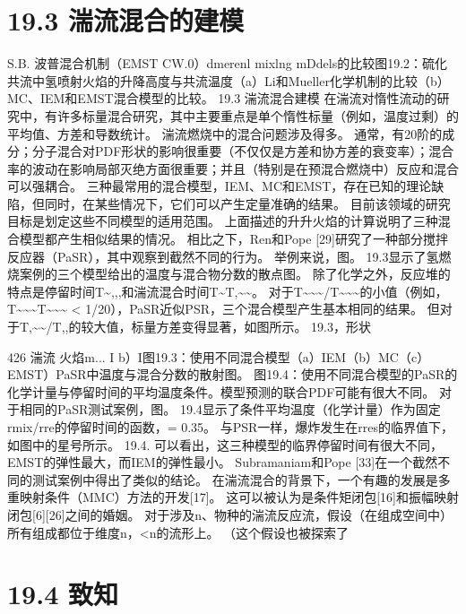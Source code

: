 \documentclass[UTF8,11pt,a4paper,openany,fontset=fandol]{ctexbook}
\begin{document}
\section{19.3 湍流混合的建模}
S.B. 波普混合机制（EMST CW.0）dmerenl mixlng mDdels的比较图19.2：硫化共流中氢喷射火焰的升降高度与共流温度（a）Li和Mueller化学机制的比较（b）MC、IEM和EMST混合模型的比较。 19.3 湍流混合建模 在湍流对惰性流动的研究中，有许多标量混合研究，其中主要重点是单个惰性标量（例如，温度过剩）的平均值、方差和导数统计。 湍流燃烧中的混合问题涉及得多。 通常，有20阶的成分；分子混合对PDF形状的影响很重要（不仅仅是方差和协方差的衰变率）；混合率的波动在影响局部灭绝方面很重要；并且（特别是在预混合燃烧中）反应和混合可以强耦合。 三种最常用的混合模型，IEM、MC和EMST，存在已知的理论缺陷，但同时，在某些情况下，它们可以产生定量准确的结果。 目前该领域的研究目标是划定这些不同模型的适用范围。 上面描述的升升火焰的计算说明了三种混合模型都产生相似结果的情况。 相比之下，Ren和Pope [29]研究了一种部分搅拌反应器（PaSR），其中观察到截然不同的行为。 举例来说，图。 19.3显示了氢燃烧案例的三个模型给出的温度与混合物分数的散点图。 除了化学之外，反应堆的特点是停留时间T\textasciitilde{},,,和湍流混合时间T\textasciitilde{}T,\textasciitilde{}\textasciitilde{}。 对于T\textasciitilde{}\textasciitilde{}\textasciitilde{}/T\textasciitilde{}\textasciitilde{}\textasciitilde{}的小值（例如，T\textasciitilde{}\textasciitilde{}\textasciitilde{}T\textasciitilde{}\textasciitilde{}\textasciitilde{} < 1/20），PaSR近似PSR，三个混合模型产生基本相同的结果。 但对于T,\textasciitilde{}\textasciitilde{}/T,,的较大值，标量方差变得显著，如图所示。 19.3，形状

426 湍流 火焰m... I b）I图19.3：使用不同混合模型（a）IEM（b）MC（c）EMST）PaSR中温度与混合分数的散射图。 图19.4：使用不同混合模型的PaSR的化学计量与停留时间的平均温度条件。模型预测的联合PDF可能有很大不同。 对于相同的PaSR测试案例，图。 19.4显示了条件平均温度（化学计量）作为固定rmix/rre的停留时间的函数，= 0.35。 与PSR一样，爆炸发生在rres的临界值下，如图中的星号所示。 19.4. 可以看出，这三种模型的临界停留时间有很大不同，EMST的弹性最大，而IEM的弹性最小。 Subramaniam和Pope [33]在一个截然不同的测试案例中得出了类似的结论。 在湍流混合的背景下，一个有趣的发展是多重映射条件（MMC）方法的开发[17]。 这可以被认为是条件矩闭包[16]和振幅映射闭包[6][26]之间的婚姻。 对于涉及n、物种的湍流反应流，假设（在组成空间中）所有组成都位于维度n，<n的流形上。 （这个假设也被探索了

\section{19.4 致知}
\end{document}
